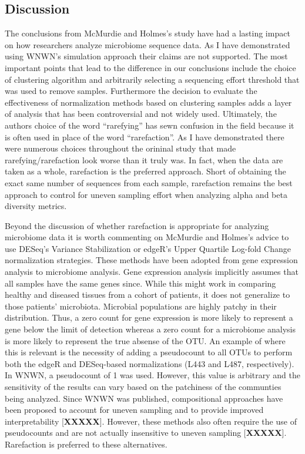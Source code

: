 \documentclass[
]{article}
\begin{document}
\hypertarget{discussion}{%
\subsection{Discussion}\label{discussion}}

The conclusions from McMurdie and Holmes's study have had a lasting
impact on how researchers analyze microbiome sequence data. As I have
demonstrated using WNWN's simulation approach their claims are not
supported. The most important points that lead to the difference in our
conclusions include the choice of clustering algorithm and arbitrarily
selecting a sequencing effort threshold that was used to remove samples.
Furthermore the decision to evaluate the effectiveness of normalization
methods based on clustering samples adds a layer of analysis that has
been controversial and not widely used. Ultimately, the authors choice
of the word ``rarefying'' has sewn confusion in the field because it is
often used in place of the word ``rarefaction''. As I have demonstrated
there were numerous choices throughout the orininal study that made
rarefying/rarefaction look worse than it truly was. In fact, when the
data are taken as a whole, rarefaction is the preferred approach. Short
of obtaining the exact same number of sequences from each sample,
rarefaction remains the best approach to control for uneven sampling
effort when analyzing alpha and beta diversity metrics.

Beyond the discussion of whether rarefaction is appropriate for
analyzing microbiome data it is worth commenting on McMurdie and
Holmes's advice to use DESeq's Variance Stabilization or edgeR's Upper
Quartile Log-fold Change normalization strategies. These methods have
been adopted from gene expression analysis to microbiome analysis. Gene
expression analysis implicitly assumes that all samples have the same
genes since. While this might work in comparing healthy and diseased
tissues from a cohort of patients, it does not generalize to those
patients' microbiota. Microbial populations are highly patchy in their
distribution. Thus, a zero count for gene expression is more likely to
represent a gene below the limit of detection whereas a zero count for a
microbiome analysis is more likely to represent the true absense of the
OTU. An example of where this is relevant is the necessity of adding a
pseudocount to all OTUs to perform both the edgeR and DESeq-based
normalizations (L443 and L487, respectively). In WNWN, a pseudocount of
1 was used. However, this value is arbitrary and the sensitivity of the
results can vary based on the patchiness of the communties being
analyzed. Since WNWN was published, compositional approaches have been
proposed to account for uneven sampling and to provide improved
interpretability {[}\textbf{XXXXX}{]}. However, these methods also often
require the use of pseudocounts and are not actually insensitive to
uneven sampling {[}\textbf{XXXXX}{]}. Rarefaction is preferred to these
alternatives.
\end{document}
